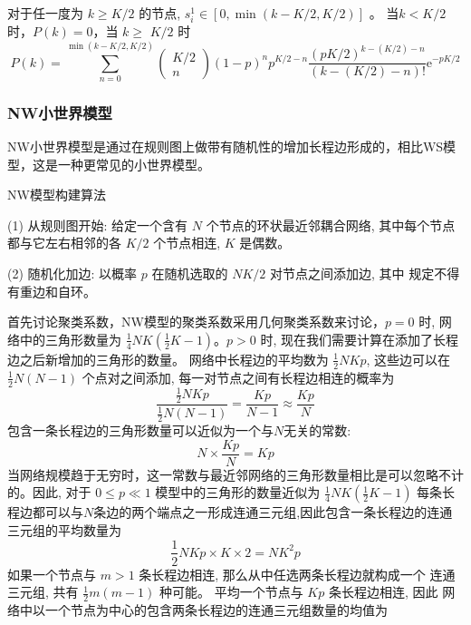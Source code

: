 对于任一度为 $k \geqslant K / 2$ 的节点, $s_i^1 \in[0, \min (k-K / 2, K / 2)]$ 。
当$k<K/2$时，$P(k)=0$，当 $k \geqslant$ $K / 2$ 时
\begin{equation}
    P(k)=\sum_{n=0}^{\min (k-K / 2, K / 2)}\left(\begin{array}{c}
    K / 2 \\
    n
    \end{array}\right)(1-p)^n p^{K / 2-n} \frac{(p K / 2)^{k-(K / 2)-n}}{(k-(K / 2)-n) !} \mathrm{e}^{-p K / 2}
\end{equation}
\subsubsection*{NW小世界模型}
NW小世界模型是通过在规则图上做带有随机性的增加长程边形成的，相比WS模型，这是一种更常见的小世界模型。\par
\noindent NW模型构建算法\par
\noindent(1) 从规则图开始: 给定一个含有 $N$ 个节点的环状最近邻耦合网络, 其中每个节点都与它左右相邻的各 $K / 2$ 个节点相连, $K$ 是偶数。\par
\noindent(2) 随机化加边: 以概率 $p$ 在随机选取的 $NK / 2$ 对节点之间添加边, 其中 规定不得有重边和自环。\par
首先讨论聚类系数，NW模型的聚类系数采用几何聚类系数来讨论，$p=0$ 时, 网络中的三角形数量为 
$\frac{1}{4} N K\left(\frac{1}{2} K-1\right)$。$ p>0$ 时, 
现在我们需要计算在添加了长程边之后新增加的三角形的数量。 网络中长程边的平均数为 $\frac{1}{2} N K p$, 
这些边可以在 $\frac{1}{2} N(N-1)$ 个点对之间添加, 每一对节点之间有长程边相连的概率为
\begin{equation}
    \frac{\frac{1}{2} N K p}{\frac{1}{2} N(N-1)}=\frac{K p}{N-1} \approx \frac{K p}{N}
 \end{equation}
 包含一条长程边的三角形数量可以近似为一个与$N$无关的常数:
 \begin{equation}
    N \times \frac{K p}{N}=K p
\end{equation}
当网络规模趋于无穷时，这一常数与最近邻网络的三角形数量相比是可以忽略不计的。因此, 对于 $0 \leqslant p \ll 1$ 
模型中的三角形的数量近似为 $\frac{1}{4} N K\left(\frac{1}{2} K-1\right) $
每条长程边都可以与$N$条边的两个端点之一形成连通三元组,因此包含一条长程边的连通三元组的平均数量为
\begin{equation}
    \frac{1}{2} N K p \times K \times 2=N K^2 p
\end{equation}
如果一个节点与 $m>1$ 条长程边相连, 那么从中任选两条长程边就构成一个 连通三元组, 共有 $\frac{1}{2} m(m-1)$ 种可能。
平均一个节点与 $K p$ 条长程边相连, 因此 网络中以一个节点为中心的包含两条长程边的连通三元组数量的均值为
